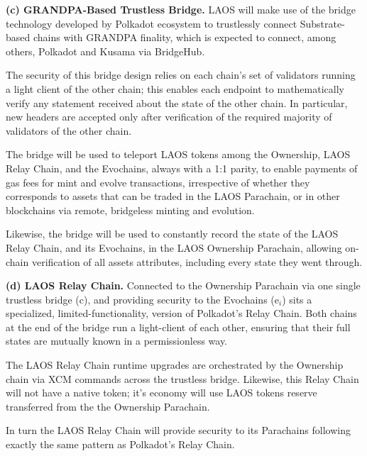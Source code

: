 \vspace{\baselineskip}

{\bf (c) GRANDPA-Based Trustless Bridge.}
LAOS will make use of the bridge technology developed 
by Polkadot ecosystem to trustlessly connect Substrate-based 
chains with GRANDPA finality\cite{parity-bridges},
which is expected to connect, among others,
Polkadot and Kusama via BridgeHub\cite{bridgehub}.

The security of this bridge design relies on each chain's set of validators
running a light client of the other chain; this enables each endpoint to     
mathematically verify any statement received about 
the state of the other chain. In particular, new headers are accepted only
after verification of the required majority of validators of the other chain.

The bridge will be used to teleport LAOS tokens among the Ownership, LAOS Relay Chain,
and the Evochains, always with a 1:1 parity, to enable payments of gas fees for 
mint and evolve transactions, irrespective of whether they corresponds
to assets that can be traded in the LAOS Parachain, or in other
blockchains via remote, bridgeless minting and evolution.

Likewise, the bridge will be used to constantly record the state of the LAOS Relay Chain,
and its Evochains, in the LAOS Ownership Parachain, allowing on-chain verification of all assets
attributes, including every state they went through.

\vspace{\baselineskip}

{\bf (d) LAOS Relay Chain.}
Connected to the Ownership Parachain via one single trustless bridge (c),
and providing security to the Evochains (e$_i$) sits a specialized, limited-functionality,
version of
Polkadot's Relay Chain. Both chains at the end of the bridge run a light-client
of each other, ensuring that their full states are mutually known in a permissionless
way.  

The LAOS Relay Chain runtime upgrades are orchestrated by
the Ownership chain via XCM commands across the trustless bridge.
Likewise, this Relay Chain will not have a native token; it's economy will use 
LAOS tokens reserve transferred from the the Ownership Parachain.

In turn the LAOS Relay Chain will provide security to its Parachains following exactly
the same pattern as Polkadot's Relay Chain.

\vspace{\baselineskip}

